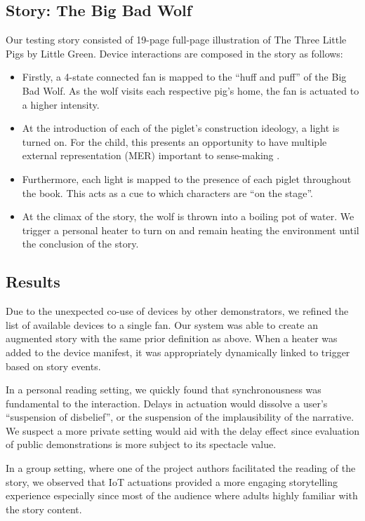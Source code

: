 \documentclass{sigchi}
\begin{document}
\subsection{Story: The Big Bad Wolf}
Our testing story consisted of 19-page full-page illustration of The Three Little Pigs by Little Green. Device interactions are composed in the story as follows:
\begin{itemize}
\item Firstly, a 4-state connected fan is mapped to the ``huff and puff'' of the Big Bad Wolf. As the wolf visits each respective pig's home, the fan is actuated to a higher intensity. 
\item At the introduction of each of the piglet's construction ideology, a light is turned on. For the child, this presents an opportunity to have multiple external representation (MER) important to sense-making \cite{ainsworth_deft:_2006}. 
\item Furthermore, each light is mapped to the presence of each piglet throughout the book. This acts as a cue to which characters are ``on the stage''. 
\item At the climax of the story, the wolf is thrown into a boiling pot of water. We trigger a personal heater to turn on and remain heating the environment until the conclusion of the story. 
\end{itemize}

\subsection{Results}
Due to the unexpected co-use of devices by other demonstrators, we refined the list of available devices to a single fan. Our system was able to create an augmented story with the same prior definition as above. When a heater was added to the device manifest, it was appropriately dynamically linked to trigger based on story events. 

In a personal reading setting, we quickly found that synchronousness was fundamental to the interaction. Delays in actuation would dissolve a user's ``suspension of disbelief'', or the suspension of the implausibility of the narrative. We suspect a more private setting would aid with the delay effect since evaluation of public demonstrations is more subject to its spectacle value. 

In a group setting, where one of the project authors facilitated the reading of the story, we observed that IoT actuations provided a more engaging storytelling experience especially since most of the audience where adults highly familiar with the story content. 
\end{document}
